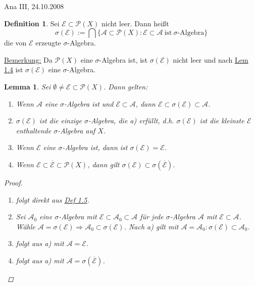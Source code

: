 \documentclass[a4paper]{scrreprt}
\newcommand{\PowerSet}{\mathcal{P}}
\newcommand{\jlabel}[1]{\label{j_#1}}
\newcommand{\jhyperref}[2]{\hyperref[j_#1]{#2}}
\newcommand{\jlink}[1]{\jhyperref{#1}{#1}}
\newcommand{\jspacesmall}{\vspace{4pt}}
\newcommand{\jdate}[1]{\jspacesmall\begin{center}\jlabel{#1}\tiny{Ana III, #1}\end{center}}
\theoremstyle{plain}
\newtheorem{lem}[thm]{Lemma}
\theoremstyle{definition}
\newtheorem{defn}[thm]{Definition}
\begin{document}
\jdate{24.10.2008}

\begin{defn}
\jlabel{Def 1.5}
    Sei $\mathcal{E} \subset \PowerSet(X)$ nicht leer. Dann heißt
    \begin{displaymath}
        \sigma(\mathcal{E}) := \bigcap\{\mathcal{A} \subset \PowerSet(X) : \mathcal{E} \subset \mathcal{A} \ \text{ist} \ \sigma\text{-Algebra}\}
    \end{displaymath}
    die von $\mathcal{E}$ erzeugte $\sigma$-Algebra.
    
    \vspace{12pt}
    
    \uline{Bemerkung:} Da $\PowerSet(X)$ eine $\sigma$-Algebra ist, ist $\sigma(\mathcal{E})$ nicht leer und nach \jlink{Lem 1.4} ist $\sigma(\mathcal{E})$ eine $\sigma$-Algebra.
\end{defn}

\begin{lem}
\jlabel{Lem 1.6}
    Sei $\emptyset \ne \mathcal{E} \subset \PowerSet(X)$. Dann gelten:
    \begin{enumerate}
        \item Wenn $\mathcal{A}$ eine $\sigma$-Algebra ist und $\mathcal{E} \subset \mathcal{A}$, dann $\mathcal{E} \subset \sigma(\mathcal{E}) \subset \mathcal{A}$.
        \item $\sigma(\mathcal{E})$ ist die einzige $\sigma$-Algebra, die a) erfüllt, d.h. $\sigma(\mathcal{E})$ ist die kleinste $\mathcal{E}$ enthaltende $\sigma$-Algebra auf $X$.
        \item Wenn $\mathcal{E}$ eine $\sigma$-Algebra ist, dann ist $\sigma(\mathcal{E}) = \mathcal{E}$.
        \item Wenn $\mathcal{E} \subset \overline{\mathcal{E}} \subset \PowerSet(X)$, dann gilt $\sigma(\mathcal{E}) \subset \sigma(\mathcal{\overline{E}})$.
    \end{enumerate}
    \begin{proof}
        \begin{enumerate}
            \item folgt direkt aus \jlink{Def 1.5}.
            \item
                Sei $\mathcal{A}_0$ eine $\sigma$-Algebra mit $\mathcal{E} \subset \mathcal{A}_0 \subset \mathcal{A}$ für jede $\sigma$-Algebra $\mathcal{A}$ mit $\mathcal{E} \subset \mathcal{A}$. Wähle $\mathcal{A} = \sigma(\mathcal{E}) \Rightarrow \mathcal{A}_0 \subset \sigma(\mathcal{E})$. Nach a) gilt mit $\mathcal{A} = \mathcal{A}_0: \sigma(\mathcal{E}) \subset \mathcal{A}_0$.
            \item folgt aus a) mit $\mathcal{A} = \mathcal{E}$.
            \item folgt aus a) mit $\mathcal{A} = \sigma(\overline{\mathcal{E}})$.
        \end{enumerate}
    \end{proof}
\end{lem}
\end{document}
